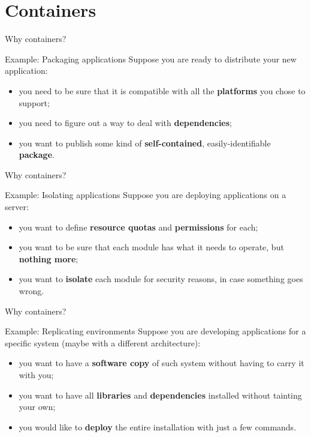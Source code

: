 
\section{Containers}
\graphicspath{{figs/section1/}}

\begin{frame}{Why containers?}
	\begin{exampleblock}{Example: Packaging applications}
		Suppose you are ready to distribute your new application:
		\begin{itemize}
			\item you need to be sure that it is compatible with all the \textbf{platforms} you chose to support;
			\item you need to figure out a way to deal with \textbf{dependencies};
			\item you want to publish some kind of \textbf{self-contained}, easily-identifiable \textbf{package}.
		\end{itemize}
	\end{exampleblock}
\end{frame}
\begin{frame}{Why containers?}
	\begin{exampleblock}{Example: Isolating applications}
		Suppose you are deploying applications on a server:
		\begin{itemize}
			\item you want to define \textbf{resource quotas} and \textbf{permissions} for each;
			\item you want to be sure that each module has what it needs to operate, but \textbf{nothing more};
			\item you want to \textbf{isolate} each module for security reasons, in case something goes wrong.
		\end{itemize}
	\end{exampleblock}
\end{frame}
\begin{frame}{Why containers?}
	\begin{exampleblock}{Example: Replicating environments}
		Suppose you are developing applications for a specific system (maybe with a different architecture):
		\begin{itemize}
			\item you want to have a \textbf{software copy} of such system without having to carry it with you;
			\item you want to have all \textbf{libraries} and \textbf{dependencies} installed without tainting your own;
			\item you would like to \textbf{deploy} the entire installation with just a few commands.
		\end{itemize}
	\end{exampleblock}
\end{frame}
